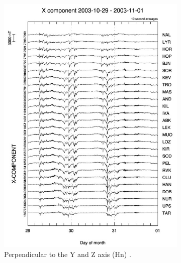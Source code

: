 \begin{figure}[H]
        \begin{subfigure}[b]{0.33\textwidth}
                \includegraphics[width=\linewidth]{figures/IMAGE_X_gram.jpg}
                \caption{Perpendicular to the Y and Z axis (Hn) \cite{image}.}
				\label{fig:image_x_gram}
        \end{subfigure}%
        \begin{subfigure}[b]{0.33\textwidth}

\end{subfigure}
\end{figure}
